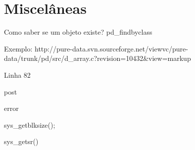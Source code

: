 
\chapter{Miscelâneas}
Como saber se um objeto existe?
pd\_findbyclass

Exemplo: http://pure-data.svn.sourceforge.net/viewvc/pure-data/trunk/pd/src/d\_array.c?revision=10432\&view=markup 

Linha 82


post

error

sys\_getblksize();

sys\_getsr()

